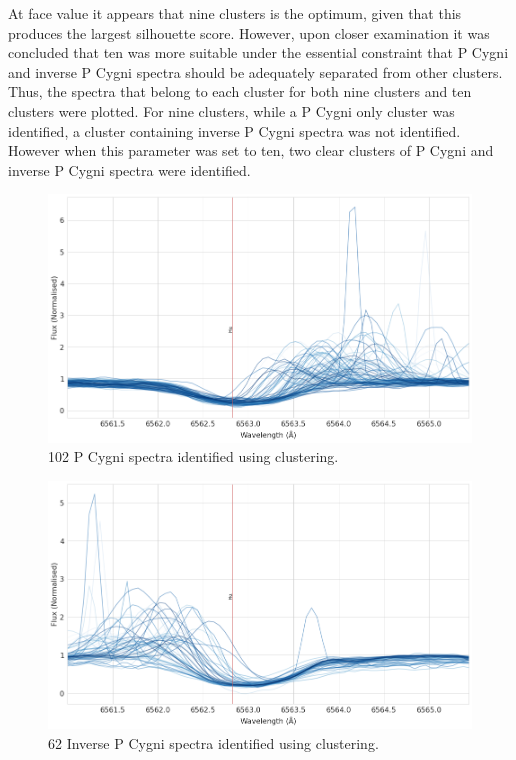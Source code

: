 At face value it appears that nine clusters is the optimum, given that this produces the largest silhouette score. However, upon closer examination it was concluded that ten was more suitable under the essential constraint that P Cygni and inverse P Cygni spectra should be adequately separated from other clusters. Thus, the spectra that belong to each cluster for both nine clusters and ten clusters were plotted. For nine clusters, while a P Cygni only cluster was identified, a cluster containing inverse P Cygni spectra was not identified. However when this parameter was set to ten, two clear clusters of P Cygni and inverse P Cygni spectra were identified.

\begin{figure}[!htb]
\centering
\includegraphics[scale=0.45]{figures/pcygni.png}
\caption{102 P Cygni spectra identified using clustering.}
\end{figure}

\begin{figure}[!htb]
\centering
\includegraphics[scale=0.45]{figures/inverse p cygni.png}
\caption{62 Inverse P Cygni spectra identified using clustering.}
\label{fig4.6}
\end{figure}

